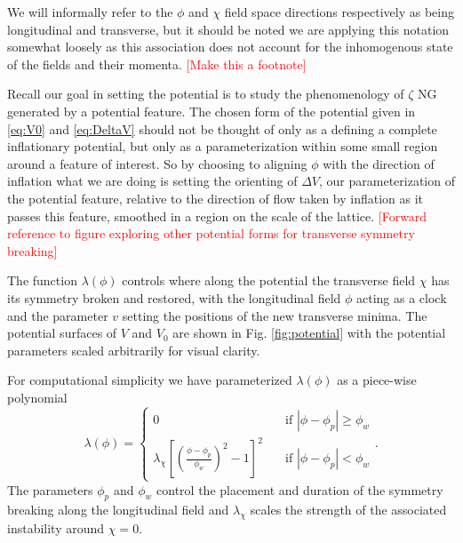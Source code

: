 
We will informally refer to the $\phi$ and $\chi$ field space directions respectively as being longitudinal and transverse, but it should be noted we are applying this notation somewhat loosely as this association does not account for the inhomogenous state of the fields and their momenta. \textcolor{red}{[Make this a footnote]}

Recall our goal in setting the potential is to study the phenomenology of $\zeta$ NG generated by a potential feature. The chosen form of the potential given in \eqref{eq:V0} and \eqref{eq:DeltaV} should not be thought of only as a defining a complete inflationary potential, but only as a parameterization within some small region around a feature of interest. So by choosing to aligning $\phi$ with the direction of inflation what we are doing is setting the orienting of $\Delta V$, our parameterization of the potential feature, relative to the direction of flow taken by inflation as it passes this feature, smoothed in a region on the scale of the lattice. \textcolor{red}{[Forward reference to figure exploring other potential forms for transverse symmetry breaking]}

The function $\lambda(\phi)$ controls where along the potential the transverse field $\chi$ has its symmetry broken and restored, with the longitudinal field $\phi$ acting as a clock and the parameter $v$ setting the positions of the new transverse minima. The potential surfaces of $V$ and $V_0$ are shown in Fig. \ref{fig:potential} with the potential parameters scaled arbitrarily for visual clarity.

For computational simplicity we have parameterized $\lambda(\phi)$ as a piece-wise polynomial
\begin{equation} \label{eq:lambda}
  \lambda(\phi) =
  \begin{cases}
    0 & \quad \text{if } |\phi-\phi_p|\ge\phi_w \\
    \lambda_\chi\left[\left(\frac{\phi-\phi_p}{\phi_w}\right)^2 - 1 \right]^2 & \quad \text{if  } |\phi-\phi_p|<\phi_w
  \end{cases}.
\end{equation}
The parameters $\phi_p$ and $\phi_w$ control the placement and duration of the symmetry breaking along the longitudinal field and $\lambda_\chi$ scales the strength of the associated instability around $\chi=0$.

